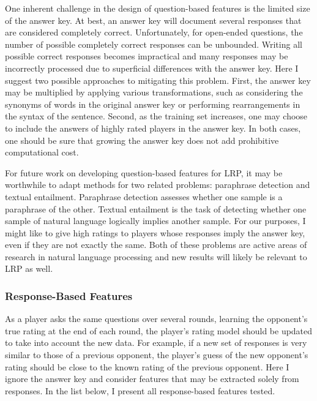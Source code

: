 One inherent challenge in the design of question-based features is the limited size of the answer key. At best, an answer key will document several responses that are considered completely correct. Unfortunately, for open-ended questions, the number of possible completely correct responses can be unbounded. Writing all possible correct responses becomes impractical and many responses may be incorrectly processed due to superficial differences with the answer key. Here I suggest two possible approaches to mitigating this problem. First, the answer key may be multiplied by applying various transformations, such as considering the synonyms of words in the original answer key or performing rearrangements in the syntax of the sentence. Second, as the training set increases, one may choose to include the answers of highly rated players in the answer key. In both cases, one should be sure that growing the answer key does not add prohibitive computational cost.

For future work on developing question-based features for LRP, it may be worthwhile to adapt methods for two related problems: paraphrase detection and textual entailment. Paraphrase detection assesses whether one sample is a paraphrase of the other. Textual entailment is the task of detecting whether one sample of natural language logically implies another sample. For our purposes, I might like to give high ratings to players whose responses imply the answer key, even if they are not exactly the same. Both of these problems are active areas of research in natural language processing and new results will likely be relevant to LRP as well.

\subsubsection{Response-Based Features}
As a player asks the same questions over several rounds, learning the opponent's true rating at the end of each round, the player's rating model should be updated to take into account the new data. For example, if a new set of responses is very similar to those of a previous opponent, the player's guess of the new opponent's rating should be close to the known rating of the previous opponent. Here I ignore the answer key and consider features that may be extracted solely from responses. In the list below, I present all response-based features tested. 

